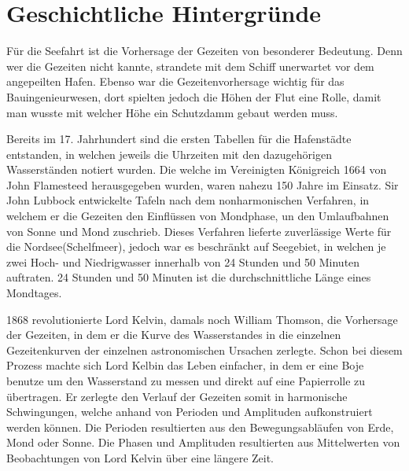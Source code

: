 %
%
%
%
\section{Geschichtliche Hintergründe\label{gezeiten:section:Geschichtliche Hintergründe}}
Für die Seefahrt ist die Vorhersage der Gezeiten von besonderer Bedeutung.
Denn wer die Gezeiten nicht kannte, strandete mit dem Schiff unerwartet vor dem angepeilten Hafen.
Ebenso war die Gezeitenvorhersage wichtig für das Bauingenieurwesen, dort spielten jedoch die Höhen der Flut eine Rolle, damit man wusste mit welcher Höhe ein Schutzdamm gebaut werden muss.

Bereits im 17. Jahrhundert sind die ersten Tabellen für die Hafenstädte entstanden,
in welchen jeweils die Uhrzeiten mit den dazugehörigen Wasserständen notiert wurden.
Die \grqq welche im Vereinigten Königreich 1664 von John Flamesteed
herausgegeben wurden, waren nahezu 150 Jahre im Einsatz.
Sir John Lubbock entwickelte Tafeln nach dem nonharmonischen Verfahren,
in welchem er die Gezeiten den Einflüssen von Mondphase, un den Umlaufbahnen von
Sonne und Mond zuschrieb. Dieses Verfahren lieferte zuverlässige Werte für die
Nordsee(Schelfmeer), jedoch war es beschränkt auf Seegebiet, in welchen je zwei Hoch- und Niedrigwasser innerhalb von 24 Stunden und 50 Minuten auftraten. 24 Stunden und 50 Minuten ist die durchschnittliche Länge eines Mondtages.

1868 revolutionierte Lord Kelvin, damals noch William Thomson, die Vorhersage der Gezeiten, in dem er die Kurve des Wasserstandes in die einzelnen Gezeitenkurven der einzelnen astronomischen Ursachen zerlegte.
Schon bei diesem Prozess machte sich Lord Kelbin das Leben einfacher, in dem er eine Boje benutze um den Wasserstand zu messen und direkt auf eine Papierrolle zu übertragen.
Er zerlegte den Verlauf der Gezeiten somit in harmonische Schwingungen, welche anhand von Perioden und Amplituden aufkonstruiert werden können.
Die Perioden resultierten aus den Bewegungsabläufen von Erde, Mond oder Sonne.
Die Phasen und Amplituden resultierten aus Mittelwerten von Beobachtungen von Lord Kelvin über eine längere Zeit.




